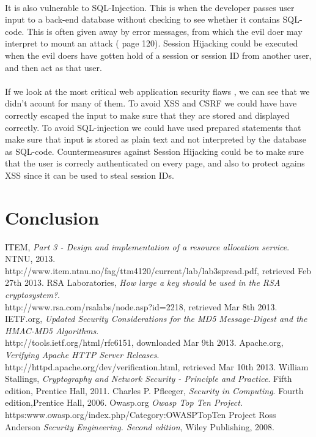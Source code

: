 \documentclass[a4paper,11pt]{article}
\begin{document}
\paragraph{}It is also vulnerable to SQL-Injection. This is when the developer passes user input to a back-end database without checking to see whether it contains SQL-code. This is often given away by error messages, from which the evil doer may interpret to mount an attack (\cite{8} page 120). Session Hijacking could be executed when the evil doers have gotten hold of a session or session ID from another user, and then act as that user.
\paragraph{}If we look at the most critical web application security flaws \cite{7}, we can see that we didn't acount for many of them. To avoid XSS and CSRF we could have have correctly escaped the input to make sure that they are stored and displayed correctly. To avoid SQL-injection we could have used prepared statements that make sure that input is stored as plain text and not interpreted by the database as SQL-code. Countermeasures against Session Hijacking could be to make sure that the user is correcly authenticated on every page, and also to protect agains XSS since it can be used to steal session IDs.
\section*{Conclusion}
\begin{thebibliography}{9}
ITEM, 
	\emph{Part 3 - Design and implementation of a resource allocation service}.
	NTNU, 2013. \\http://www.item.ntnu.no/fag/ttm4120/current/lab/lab3spread.pdf, retrieved Feb 27th 2013.
RSA Laboratories, \emph{How large a key should be used in the RSA cryptosystem?}.\\ http://www.rsa.com/rsalabs/node.asp?id=2218, retrieved Mar 8th 2013.	
IETF.org, \emph{Updated Security Considerations for the MD5 Message-Digest and the HMAC-MD5 Algorithms}.\\ http://tools.ietf.org/html/rfc6151, downloaded Mar 9th 2013.
 Apache.org, \emph{Verifying Apache HTTP Server Releases}.\\ http://httpd.apache.org/dev/verification.html, retrieved Mar 10th 2013.
William Stallings, \emph{Cryptography and Network Security - Principle and Practice}. Fifth edition, Prentice Hall, 2011.
Charles P. Pfleeger, \emph{Security in Computing}. Fourth edition,Prentice Hall, 2006.
Owasp.org \emph{Owasp Top Ten Project}.\\ https:www.owasp.org/index.php/Category:OWASP\textunderscore Top\textunderscore Ten \textunderscore Project
Ross Anderson \emph{Security Engineering. Second edition}, Wiley Publishing, 2008.
\end{thebibliography}
\listoffigures
\end{document}
